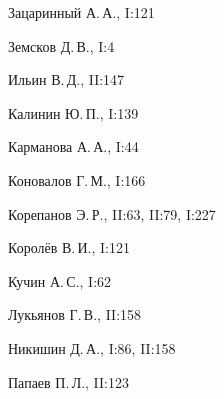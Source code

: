 \begin{theindex}
  \indexspace





  \item Зацаринный А.\,А., I:121


  \item Земсков Д.\,В., I:4





  \indexspace





  \item Ильин В.\,Д., II:147





  \indexspace





  \item Калинин Ю.\,П., I:139


  \item Карманова А.\,А., I:44


  \item Коновалов Г.\,М., I:166


  \item Корепанов Э.\,Р., II:63, II:79, I:227


  \item Королёв В.\,И., I:121


  \item Кучин А.\,С., I:62





  \indexspace





  \item Лукьянов Г.\,В., II:158





  \indexspace





  \item Никишин Д.\,А., I:86, II:158





  \indexspace





  \item Папаев П.\,Л., II:123



\end{theindex}
